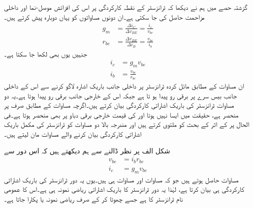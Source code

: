 گزشتہ حصے میں ہم نے دیکھا کہ ٹرانزسٹر کے نقطہ کارکردگی پر اس کی افزائش موصل-نما   اور داخلی مزاحمت   حاصل کی جا سکتی ہے۔ان دونوں مساواتوں کو یہاں دوبارہ پیش کرتے ہیں۔
\begin{align}
g_m &=\frac{\Delta i_C}{\Delta v_{BE}}=\frac{i_c}{v_{be}}\\
r_{be}&=\frac{\Delta v_{BE}}{\Delta i_B}=\frac{v_{be}}{i_b}
\end{align}
جنہیں یوں بھی لکھا جا سکتا ہے۔
\begin{align}
i_c &= g_m v_{be} \label{مساوات_ٹرانزسٹر_باریک_اشارات_کلکٹر _رو} \\
i_b&=\frac{v_{be}}{r_{be}} \label{مساوات_ٹرانزسٹر_باریک_اشارات_قابو_رو}
\end{align}
ان مساوات کے مطابق مائل کردہ ٹرانزسٹر پر داخلی جانب باریک اشارہ  لاگو کرنے سے اس کے داخلی جانب  بیس سرے پر برقی رو  پیدا ہو تا ہے جبکہ اس کے خارجی جانب برقی رو  پیدا ہوتا ہے۔یہ دو مساوات ٹرانزسٹر کی باریک اشاراتی کارکردگی بیان کرتے ہیں۔اگرچہ مساوات   کے مطابق  صرف  پر منحصر ہے، حقیقت میں ایسا نہیں ہوتا اور   کی قیمت خارجی برقی دباو  پر بھی منحصر ہوتا ہے۔فی الحال  پر  کے اثر کے بحث کو ملتوی کرتے ہیں اور مندرجہ بالا دو مساوات کو ٹرانزسٹر کی مکمل باریک اشاراتی کارکردگی بیان کرنے والے مساوات مان لیتے ہیں۔

شکل  الف پر نظر ڈالنے سے ہم دیکھتے ہیں کہ  اس دور سے 
\begin{align*}
v_{be}&=i_b r_{be}\\
i_c &=g_m v_{be}
\end{align*}
مساوات حاصل ہوتے ہیں جو کہ مساوات   اور مساوات   ہی ہیں۔یوں یہ دور ٹرانزسٹر کی باریک اشاراتی کارکردگی ہی بیان کرتا ہے، لہٰذا یہ دور ٹرانزسٹر کا باریک اشاراتی ریاضی نمونہ ہی ہے۔اس کا عمومی نام ٹرانزسٹر کا     ہے جسے چھوٹا کر کے صرف   ریاضی نمونہ یا  پکارا جاتا ہے۔

